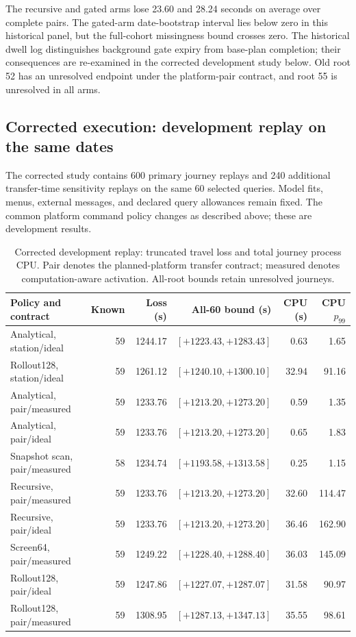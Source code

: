 \documentclass[preprint,12pt,authoryear]{elsarticle}
\begin{document}
The recursive and gated arms lose 23.60 and 28.24 seconds on average
over complete pairs. The gated-arm date-bootstrap interval lies below zero in
this historical panel, but the full-cohort missingness bound crosses zero.
The historical dwell log distinguishes background gate
expiry from base-plan completion; their consequences are re-examined in the
corrected development study below. Old root 52 has an unresolved endpoint under
the platform-pair contract, and root 55 is unresolved in all arms.

\subsection{Corrected execution: development replay on the same dates}
The corrected study contains 600 primary journey replays and 240 additional transfer-time sensitivity replays on the same 60 selected queries. Model fits, menus, external messages, and declared query allowances remain fixed. The common platform command policy changes as described above; these are development results.

\begin{table}[ht]
\centering\small\setlength{\tabcolsep}{4pt}
\caption{Corrected development replay: truncated travel loss and total journey process CPU. Pair denotes the planned-platform transfer contract; measured denotes computation-aware activation. All-root bounds retain unresolved journeys.}
\begin{tabular}{p{}rrrrr}
\toprule
Policy and contract & Known & Loss (s) & All-60 bound (s) & CPU (s) & CPU $p_{99}$ \\
\midrule
Analytical, station/ideal & 59 & 1244.17 & $[+1223.43,+1283.43]$ & 0.63 & 1.65 \\
Rollout128, station/ideal & 59 & 1261.12 & $[+1240.10,+1300.10]$ & 32.94 & 91.16 \\
Analytical, pair/measured & 59 & 1233.76 & $[+1213.20,+1273.20]$ & 0.59 & 1.35 \\
Analytical, pair/ideal & 59 & 1233.76 & $[+1213.20,+1273.20]$ & 0.65 & 1.83 \\
Snapshot scan, pair/measured & 58 & 1234.74 & $[+1193.58,+1313.58]$ & 0.25 & 1.15 \\
Recursive, pair/measured & 59 & 1233.76 & $[+1213.20,+1273.20]$ & 32.60 & 114.47 \\
Recursive, pair/ideal & 59 & 1233.76 & $[+1213.20,+1273.20]$ & 36.46 & 162.90 \\
Screen64, pair/measured & 59 & 1249.22 & $[+1228.40,+1288.40]$ & 36.03 & 145.09 \\
Rollout128, pair/ideal & 59 & 1247.86 & $[+1227.07,+1287.07]$ & 31.58 & 90.97 \\
Rollout128, pair/measured & 59 & 1308.95 & $[+1287.13,+1347.13]$ & 35.55 & 98.61 \\
\bottomrule
\end{tabular}
\end{table}
\end{document}
